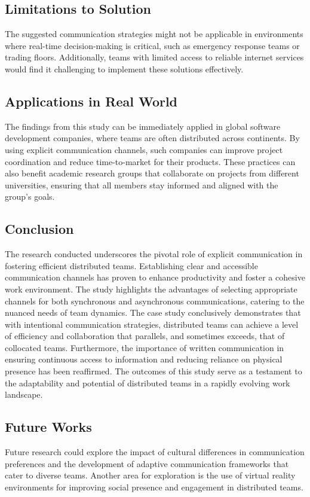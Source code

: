 \documentclass[12pt]{article}
\begin{document}
\subsection{Limitations to Solution}
The suggested communication strategies might not be applicable in environments where real-time decision-making is critical, such as emergency response teams or trading floors. Additionally, teams with limited access to reliable internet services would find it challenging to implement these solutions effectively.

\subsection{Applications in Real World}
The findings from this study can be immediately applied in global software development companies, where teams are often distributed across continents. By using explicit communication channels, such companies can improve project coordination and reduce time-to-market for their products. These practices can also benefit academic research groups that collaborate on projects from different universities, ensuring that all members stay informed and aligned with the group's goals.

\subsection{Conclusion}
The research conducted underscores the pivotal role of explicit communication in fostering efficient distributed teams. Establishing clear and accessible communication channels has proven to enhance productivity and foster a cohesive work environment. The study highlights the advantages of selecting appropriate channels for both synchronous and asynchronous communications, catering to the nuanced needs of team dynamics. The case study conclusively demonstrates that with intentional communication strategies, distributed teams can achieve a level of efficiency and collaboration that parallels, and sometimes exceeds, that of collocated teams. Furthermore, the importance of written communication in ensuring continuous access to information and reducing reliance on physical presence has been reaffirmed. The outcomes of this study serve as a testament to the adaptability and potential of distributed teams in a rapidly evolving work landscape.


\subsection{Future Works}
Future research could explore the impact of cultural differences in communication preferences and the development of adaptive communication frameworks that cater to diverse teams. Another area for exploration is the use of virtual reality environments for improving social presence and engagement in distributed teams.
\end{document}
